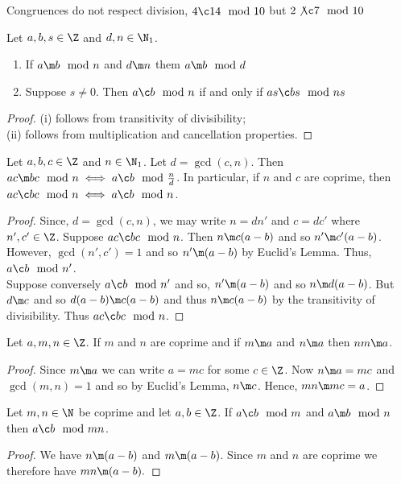 \begin{remark}
   Congruences do not respect division, $4 \c 14 \mod 10$ but $2 \not\c 7 \mod 10$
\end{remark}

\begin{nprop}
  Let $a, b, s \in \Z$ and $d, n \in \N_1$.
  \begin{enumerate}
    \item If $a \m b \mod n$ and $d \m n$ them $a \m b \mod d$
    \item Suppose $s \ne 0$. Then $a \c b \mod n$ if and only if $as \c bs \mod ns$
  \end{enumerate}
\end{nprop}
\begin{proof}
  (i) follows from transitivity of divisibility;\\
  (ii) follows from multiplication and cancellation properties.
\end{proof}

\begin{nthm}
  Let $a, b, c \in \Z$ and $n \in \N_1$. Let $d = \gcd (c, n)$. Then $ac \m bc \mod n \iff a \c b \mod \frac{n}{d}$. In particular, if $n$ and $c$ are coprime, then $ac \c bc \mod n \iff a \c b \mod n$.
\end{nthm}
\begin{proof}
  Since, $d = \gcd(c, n)$, we may write $n = dn'$ and $c = dc'$ where $n',c' \in \Z$. Suppose $ac \c bc \mod n$. Then $n \m c(a - b)$ and so $n' \m c'(a - b)$. However, $\gcd(n', c') = 1$ and so $n' \m (a - b)$ by Euclid's Lemma. Thus, $a \c b \mod n'$.\\
  Suppose conversely $a \c b \mod n'$ and so, $n' \m (a - b)$ and so $n \m d(a - b)$. But $d \m c$ and so $d(a - b) \m c(a - b)$ and thus $n \m c(a - b)$ by the transitivity of divisibility. Thus $ac \c bc \mod n$.
\end{proof}

\begin{nprop}
  Let $a, m, n \in \Z$. If $m$ and $n$ are coprime and if $m \m a$ and $n \m a$ then $nm \m a$.
\end{nprop}

\begin{proof}
  Since $m \m a$ we can write $a = mc$ for some $c \in \Z$. Now $n \m a = mc$ and $\gcd(m, n) = 1$ and so by Euclid's Lemma, $n \m c$. Hence, $mn \m mc = a$.
\end{proof}

\begin{ncor}
  Let $m, n \in \N$ be coprime and let $a, b \in \Z$. If $a \c b \mod m$ and $a \m b \mod n$ then $a \c b \mod mn$.
\end{ncor}
\begin{proof}
  We have $n \m (a - b)$ and $m \m (a - b)$. Since $m$ and $n$ are coprime we therefore have $mn \m (a - b).$
\end{proof}
